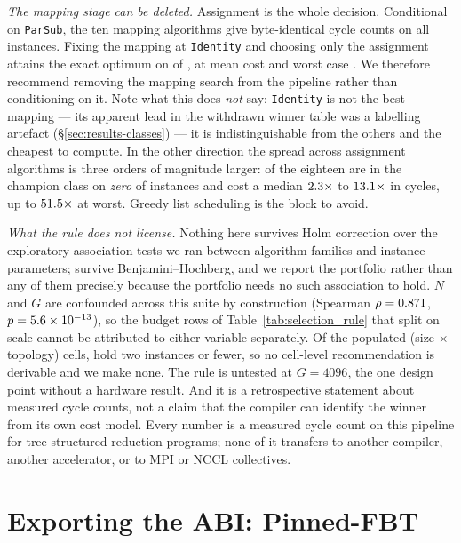 \documentclass[journal,10pt]{IEEEtran}
\theoremstyle{plain}
\theoremstyle{definition}
\theoremstyle{remark}
\newcommand{\sv}[1]{\texttt{#1}}
\begin{document}
\emph{The mapping stage can be deleted.} Assignment is the whole decision.
Conditional on \sv{ParSub}, the ten mapping algorithms give byte-identical
cycle counts on all \TournNInst{} instances. Fixing the mapping at
\sv{Identity} and choosing only the assignment attains the exact optimum on
\SelIdentityOpt{} of \TournNInst{}, at mean cost \SelIdentityMean{} and worst
case \SelIdentityWorst{}. We therefore recommend removing the mapping search
from the pipeline rather than conditioning on it. Note what this does
\emph{not} say: \sv{Identity} is not the best mapping --- its apparent lead in
the withdrawn winner table was a labelling artefact
(\S\ref{sec:results-classes}) --- it is indistinguishable from the others and
the cheapest to compute. In the other direction the spread across assignment
algorithms is three orders of magnitude larger: \SelZeroCount{} of the
eighteen are in the champion class on \emph{zero} of \TournNInst{} instances
and cost a median $2.3\times$ to $13.1\times$ in
cycles, up to $51.5\times$ at worst. Greedy list scheduling is the
block to avoid.



\emph{What the rule does not license.} Nothing here survives Holm correction
over the \SelExpTests{} exploratory association tests we ran between algorithm
families and instance parameters; \SelBHSurvivors{} survive
Benjamini--Hochberg, and we report the portfolio rather than any of them
precisely because the portfolio needs no such association to hold. $N$ and $G$
are confounded across this suite by construction (Spearman
$\rho = 0.871$, $p = 5.6\times10^{-13}$), so the budget rows of
Table~\ref{tab:selection_rule} that split on scale cannot be attributed to
either variable separately. Of the \SelPopCells{} populated
(size $\times$ topology) cells, \SelThinCells{} hold two instances or fewer,
so no cell-level recommendation is derivable and we make none. The rule is
untested at $G = 4096$, the one design point without a hardware result. And it
is a retrospective statement about measured cycle counts, not a claim that the
compiler can identify the winner from its own cost model. Every number is a
measured cycle count on this pipeline for tree-structured reduction programs;
none of it transfers to another compiler, another accelerator, or to MPI or
NCCL collectives.


\section{Exporting the ABI: Pinned-FBT}\label{sec:pinfbt}
\end{document}
